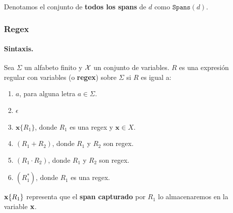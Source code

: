 Denotamos el conjunto de \textbf{todos los spans} de $d$ como $\texttt{Spans}(d)$.

\newpage
\subsubsection{Regex}
\paragraph{Sintaxis.} Sea $\Sigma$ un alfabeto finito y $\mathcal{X}$ un conjunto de variables. $R$ es una expresión regular con variables (o \textbf{regex}) sobre $\Sigma$ si $R$ es igual a:
\begin{enumerate}
    \item $a$, para alguna letra $a \in \Sigma$.
    \item $\epsilon$
    \item $\mathbf{x}\{R_1\}$, donde $R_1$ es una regex y $\mathbf{x} \in X$.
    \item $(R_1 + R_2)$, donde $R_1$ y $R_2$ son regex.
    \item $(R_1 \cdot R_2)$, donde $R_1$ y $R_2$ son regex.
    \item $(R_1^*)$, donde $R_1$ es una regex.
\end{enumerate}

$\mathbf{x}\{R_1\}$ representa que el \textbf{span capturado} por $R_1$ lo almacenaremos en la variable $\mathbf{x}$.


